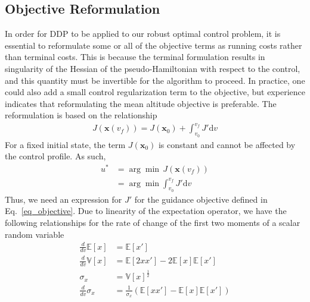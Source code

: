 \documentclass[journal ]{new-aiaa}
\newcommand{\state}{\ensuremath{\mathbf{x}}}
\newcommand{\E}[1]{\mathbb{E}\left[#1\right]}
\newcommand{\V}[1]{\mathbb{V}[#1]}
\begin{document}
\subsection*{Objective Reformulation}
In order for DDP to be applied to our robust optimal control problem, it is essential to reformulate some or all of the objective terms as running costs rather than terminal costs. This is because the terminal formulation results in singularity of the Hessian of the pseudo-Hamiltonian with respect to the control, and this quantity must be invertible for the algorithm to proceed. In practice, one could also add a small control regularization term to the objective, but experience indicates that reformulating the mean altitude objective is preferable. The reformulation is based on the relationship 
\begin{align}
	J(\state(v_f)) = J(\state_0) + \int_{v_0}^{v_f}J'\mathrm{d}v \label{Eq:GenericCostRate}
\end{align}
For a fixed initial state, the term $J(\state_0)$ is constant and cannot be affected by the control profile. As such, 
\begin{align}
	u^* &= \arg\min \,J(\state(v_f)) \\
	    &= \arg\min\int_{v_0}^{v_f}J'\mathrm{d}v
\end{align}
Thus, we need an expression for $J'$ for the guidance objective defined in Eq.~\eqref{eq_objective}. Due to linearity of the expectation operator, we have the following relationships for the rate of change of the first two moments of a scalar random variable
\begin{align}
	\frac{d }{d v}\E{x} &= \E{x'} \label{Eq:MeanRateVel}\\
	\frac{d }{d v}\V{x} &= \E{2xx'} - 2\E{x}\E{x'} \\
	\sigma_x &= \V{x}^{\frac{1}{2}} \\
	\frac{d }{d v}\sigma_x &= \frac{1}{\sigma_x}\left(\E{xx'} - \E{x}\E{x'}\right) \label{Eq:StdRateVel}
\end{align}
\end{document}
